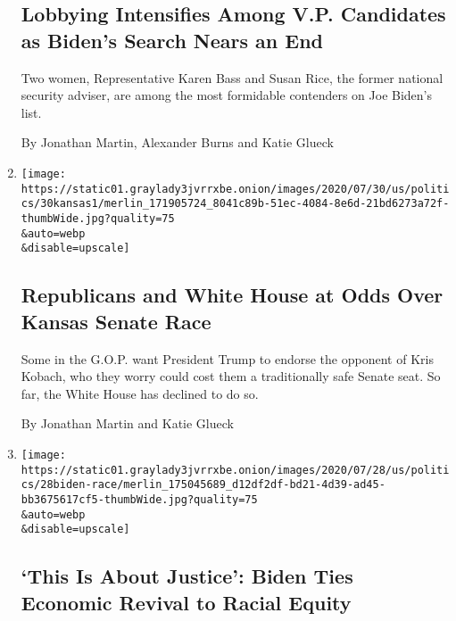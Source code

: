 \begin{enumerate}
  \hypertarget{lobbying-intensifies-among-vp-candidates-as-bidens-search-nears-an-end}{%
  \subsection{Lobbying Intensifies Among V.P. Candidates as Biden's
  Search Nears an
  End}\label{lobbying-intensifies-among-vp-candidates-as-bidens-search-nears-an-end}}

  Two women, Representative Karen Bass and Susan Rice, the former
  national security adviser, are among the most formidable contenders on
  Joe Biden's list.

  By Jonathan Martin, Alexander Burns and Katie Glueck
\item
  \href{/2020/07/30/us/politics/kansas-senate-kobach-trump.html}{}

  \texttt{[image: https://static01.graylady3jvrrxbe.onion/images/2020/07/30/us/politics/30kansas1/merlin\_171905724\_8041c89b-51ec-4084-8e6d-21bd6273a72f-thumbWide.jpg?quality=75\\\&auto=webp\\\&disable=upscale]}

  \hypertarget{republicans-and-white-house-at-odds-over-kansas-senate-race}{%
  \subsection{Republicans and White House at Odds Over Kansas Senate
  Race}\label{republicans-and-white-house-at-odds-over-kansas-senate-race}}

  Some in the G.O.P. want President Trump to endorse the opponent of
  Kris Kobach, who they worry could cost them a traditionally safe
  Senate seat. So far, the White House has declined to do so.

  By Jonathan Martin and Katie Glueck
\item
  \href{/2020/07/28/us/politics/joe-biden-racial-justice-economy-plan.html}{}

  \texttt{[image: https://static01.graylady3jvrrxbe.onion/images/2020/07/28/us/politics/28biden-race/merlin\_175045689\_d12df2df-bd21-4d39-ad45-bb3675617cf5-thumbWide.jpg?quality=75\\\&auto=webp\\\&disable=upscale]}

  \hypertarget{this-is-about-justice-biden-ties-economic-revival-to-racial-equity}{%
  \subsection{`This Is About Justice': Biden Ties Economic Revival to
  Racial
  Equity}\label{this-is-about-justice-biden-ties-economic-revival-to-racial-equity}}


\end{enumerate}
